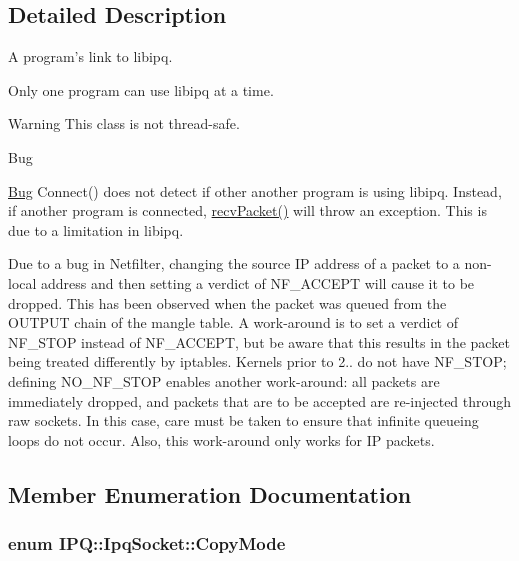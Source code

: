 \subsection{\-Detailed \-Description}
\-A program's link to libipq. 

\-Only one program can use libipq at a time. \begin{DoxyWarning}{\-Warning}
\-This class is not thread-\/safe. 
\end{DoxyWarning}
\begin{DoxyRefDesc}{\-Bug}
\item[\hyperlink{bug__bug000001}{\-Bug}]\-Connect() does not detect if other another program is using libipq. \-Instead, if another program is connected, \hyperlink{classIPQ_1_1IpqSocket_aff35b95d33b21474f844660fef28938c}{recv\-Packet()} will throw an exception. \-This is due to a limitation in libipq. 

\-Due to a bug in \-Netfilter, changing the source \-I\-P address of a packet to a non-\/local address and then setting a verdict of \-N\-F\-\_\-\-A\-C\-C\-E\-P\-T will cause it to be dropped. \-This has been observed when the packet was queued from the \-O\-U\-T\-P\-U\-T chain of the mangle table. \-A work-\/around is to set a verdict of \-N\-F\-\_\-\-S\-T\-O\-P instead of \-N\-F\-\_\-\-A\-C\-C\-E\-P\-T, but be aware that this results in the packet being treated differently by iptables. \-Kernels prior to 2.. do not have \-N\-F\-\_\-\-S\-T\-O\-P; defining \-N\-O\-\_\-\-N\-F\-\_\-\-S\-T\-O\-P enables another work-\/around\-: all packets are immediately dropped, and packets that are to be accepted are re-\/injected through raw sockets. \-In this case, care must be taken to ensure that infinite queueing loops do not occur. \-Also, this work-\/around only works for \-I\-P packets. \end{DoxyRefDesc}


\subsection{\-Member \-Enumeration \-Documentation}
\hypertarget{classIPQ_1_1IpqSocket_afee6d75480079906ecf6544f8467e0cc}{
\subsubsection[{\-Copy\-Mode}]{\setlength{\rightskip}{0pt plus 5cm}enum {\bf \-I\-P\-Q\-::\-Ipq\-Socket\-::\-Copy\-Mode}}}
\label{classIPQ_1_1IpqSocket_afee6d75480079906ecf6544f8467e0cc}


